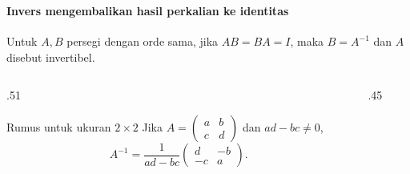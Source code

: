 \documentclass{../../kalkulus-ppt}
\begin{document}
\begin{frame}
    \frametitle{\insertsection}
    \framesubtitle{Invers mengembalikan hasil perkalian ke identitas}
    \begin{definisi}
        Untuk $A,B$ persegi dengan orde sama, jika $AB=BA=I$, maka $B=A^{-1}$ dan $A$ disebut invertibel.
    \end{definisi}
    \begin{columns}[c,onlytextwidth]
        \begin{column}{.51\textwidth}
            \begin{block}{Rumus untuk ukuran $2\times2$}
                Jika $A=\begin{pmatrix}a&b\\c&d\end{pmatrix}$ dan $ad-bc\ne0$,
                \[
                    A^{-1}=\frac{1}{ad-bc}\begin{pmatrix}d&-b\\-c&a\end{pmatrix}.
                \]
            \end{block}
        \end{column}
        \begin{column}{.45\textwidth}
        \end{column}
    \end{columns}
\end{frame}
\end{document}
